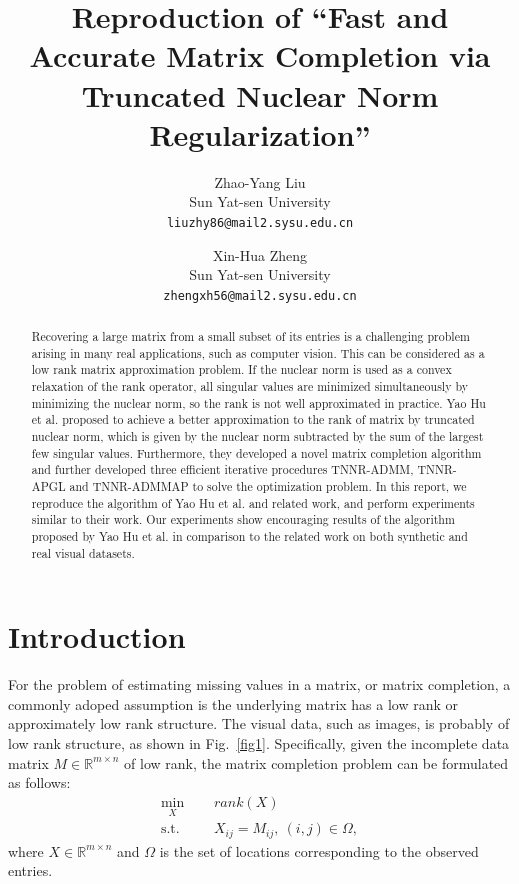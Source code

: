 \documentclass{article}
\title{Reproduction of ``Fast and Accurate Matrix Completion via Truncated Nuclear Norm Regularization''}
\author{%
  Zhao-Yang Liu\\ %
    Sun Yat-sen University \\
  \texttt{liuzhy86@mail2.sysu.edu.cn} \\
  \and
  Xin-Hua Zheng \\
  Sun Yat-sen University \\
  \texttt{zhengxh56@mail2.sysu.edu.cn} \\
}
\begin{document}
{

\maketitle


\begin{abstract}
Recovering a large matrix from a small subset of its entries is a challenging problem arising in many real applications, such as computer vision. This can be considered as a low rank matrix approximation problem. If the nuclear norm is used as a convex relaxation of the rank operator, all singular values are minimized simultaneously by minimizing the nuclear norm, so the rank is not well approximated in practice. 
Yao Hu et al. proposed to achieve a better approximation to the rank of matrix by truncated nuclear norm, which is given by the nuclear norm subtracted by the sum of the largest few singular values. Furthermore, they developed a novel matrix completion algorithm and further developed three efficient iterative procedures TNNR-ADMM, TNNR-APGL and TNNR-ADMMAP to solve the optimization problem.
In this report, we reproduce the algorithm of Yao Hu et al. and related work, and perform experiments similar to their work. Our experiments show encouraging results of the algorithm proposed by Yao Hu et al. in comparison to the related work on both synthetic and real visual datasets.
\end{abstract}


\section{Introduction}
For the problem of estimating missing values in a matrix, or matrix completion, a commonly adoped assumption is the underlying matrix has a low rank or approximately low rank structure.
The visual data, such as images, is probably of low rank structure, as shown in Fig.~\ref{fig1}.
Specifically, given the incomplete data matrix $M \in \mathbb{R}^{m \times n}$ of low rank, the matrix completion problem can be formulated as follows:
\begin{equation}
	\begin{aligned}
		\label{rmin}
		\underset{X}{\text{min}} \ \ \ \ &  \ \ rank(X) \\
		\text{s.t.} \ \ \ \ &  \ \  X_{ij} = M_{ij}, \ (i,j) \in \Omega,
	\end{aligned}
\end{equation}
where $X \in \mathbb{R}^{m \times n}$ and $\Omega$ is the set of locations corresponding to the observed entries.

}
\end{document}
